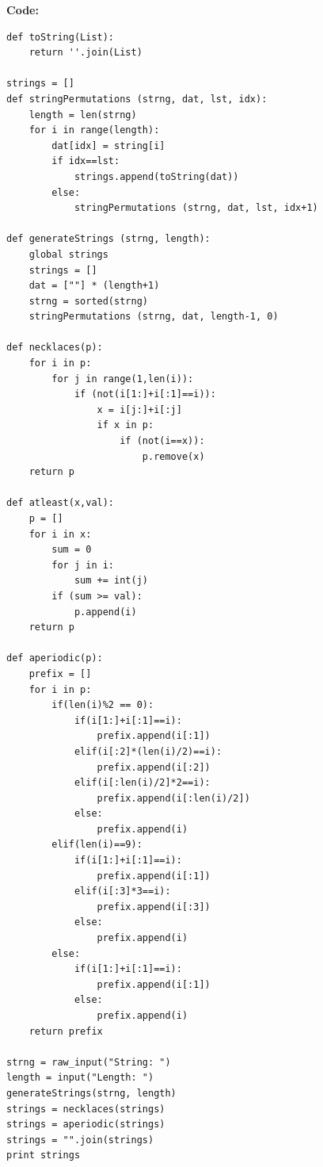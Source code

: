 \documentclass[12pt,twoside]{article}
\begin{document}
\textbf{Code:}
\begin{verbatim}
def toString(List):
    return ''.join(List)

strings = []
def stringPermutations (strng, dat, lst, idx):
    length = len(strng)
    for i in range(length):
        dat[idx] = string[i]
        if idx==lst:
            strings.append(toString(dat))
        else:
            stringPermutations (strng, dat, lst, idx+1)

def generateStrings (strng, length):
    global strings
    strings = []
    dat = [""] * (length+1)
    strng = sorted(strng)
    stringPermutations (strng, dat, length-1, 0)

def necklaces(p):
    for i in p:
        for j in range(1,len(i)):
            if (not(i[1:]+i[:1]==i)):
                x = i[j:]+i[:j]
                if x in p:
                    if (not(i==x)):
                        p.remove(x)
    return p

def atleast(x,val):
    p = []
    for i in x:
        sum = 0
        for j in i:
            sum += int(j)
        if (sum >= val):
            p.append(i)
    return p

def aperiodic(p):
    prefix = []
    for i in p:
        if(len(i)%2 == 0):
            if(i[1:]+i[:1]==i):
                prefix.append(i[:1])
            elif(i[:2]*(len(i)/2)==i):
                prefix.append(i[:2])
            elif(i[:len(i)/2]*2==i):
                prefix.append(i[:len(i)/2])
            else:
                prefix.append(i)
        elif(len(i)==9):
            if(i[1:]+i[:1]==i):
                prefix.append(i[:1])
            elif(i[:3]*3==i):
                prefix.append(i[:3])
            else:
                prefix.append(i)
        else:
            if(i[1:]+i[:1]==i):
                prefix.append(i[:1])
            else:
                prefix.append(i)
    return prefix
    
strng = raw_input("String: ")
length = input("Length: ")
generateStrings(strng, length)
strings = necklaces(strings)
strings = aperiodic(strings)
strings = "".join(strings)
print strings

\end{verbatim}
\end{document}
